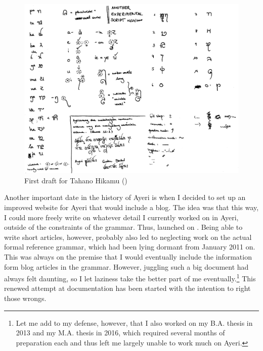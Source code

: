 \begin{figure}
	\centering
	\includegraphics[width=\textwidth, keepaspectratio]{images/th2005-300dpi-bw.png}
	\caption[First draft for Tahano Hikamu]{First draft for Tahano Hikamu ()}
	\label{fig:th2005}
\end{figure}

Another important date in the history of Ayeri is when I decided to set up an 
improved website for Ayeri that would include a blog. The idea was that this 
way, I could more freely write on whatever detail I currently worked on in 
Ayeri, outside of the constraints of the grammar. Thus,  launched on . Being able to write short 
articles, however, probably also led to neglecting work on the actual formal 
reference grammar, which had been lying dormant from January 2011 on. This was 
always on the premise that I would eventually include the information form 
blog articles in the grammar. However, juggling such a big document had always 
felt daunting, so I let laziness take the better part of me eventually.\footnote{
Let me add to my defense, however, that I also worked on my B.A. thesis in 2013 
and my M.A. thesis in 2016, which required several months of preparation each 
and thus left me largely unable to work much on Ayeri.} This renewed attempt at 
documentation has been started with the intention to right those wrongs.
